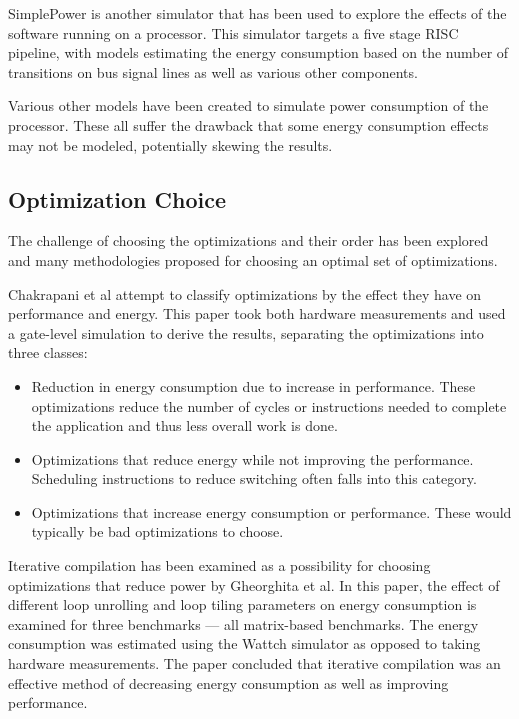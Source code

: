 \documentclass[twocolumn]{article}
\begin{document}
SimplePower\cite{SimplePower} is another simulator that has been used to explore the effects of the software running on a processor. This simulator targets a five stage RISC pipeline, with models estimating the energy consumption based on the number of transitions on bus signal lines as well as various other components.

Various other models have been created to simulate power consumption of the processor\cite{Park2011,Schneider2005}. These all suffer the drawback that some energy consumption effects may not be modeled, potentially skewing the results.

\subsection{Optimization Choice}

The challenge of choosing the optimizations and their order has been explored and many methodologies proposed for choosing an optimal set of optimizations.

Chakrapani et al attempt to classify optimizations by the effect they have on performance and energy\cite{WhatCanAPoorCompilerDo}. This paper took both hardware measurements and used a gate-level simulation to derive the results, separating the optimizations into three classes:
\begin{itemize}
	\setlength{\itemsep}{0em}
	\vspace{-1mm}
	\item Reduction in energy consumption due to increase in performance. These optimizations reduce the number of cycles or instructions needed to complete the application and thus less overall work is done.
	\item Optimizations that reduce energy while not improving the performance. Scheduling instructions to reduce switching often falls into this category.
	\item Optimizations that increase energy consumption or performance. These would typically be bad optimizations to choose.
\end{itemize}

Iterative compilation has been examined as a possibility for choosing optimizations that reduce power by Gheorghita et al\cite{IterativeCompilationForEnergy}. In this paper, the effect of different loop unrolling and loop tiling parameters on energy consumption is examined for three benchmarks --- all matrix-based benchmarks. The energy consumption was estimated using the Wattch simulator as opposed to taking hardware measurements. The paper concluded that iterative compilation was an effective method of decreasing energy consumption as well as improving performance.
\end{document}

